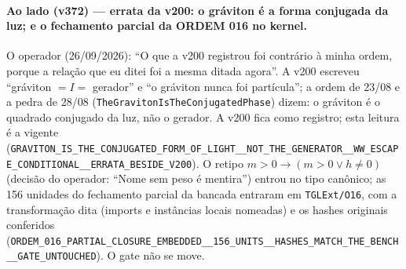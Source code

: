 \documentclass[11pt]{article}
\theoremstyle{definition}\newtheorem{deriv}{Derivação}
\begin{document}
\paragraph*{Ao lado (v372) --- errata da v200: o gráviton é a forma conjugada da luz; e o fechamento parcial da ORDEM 016 no kernel.} O operador (26/09/2026): ``O que a v200 registrou foi contrário à minha ordem, porque a relação que eu ditei foi a mesma ditada agora''. A v200 escreveu ``gráviton $=I=$ gerador'' e ``o gráviton nunca foi partícula''; a ordem de 23/08 e a pedra de 28/08 (\texttt{TheGravitonIsTheConjugatedPhase}) dizem: o gráviton é o quadrado conjugado da luz, não o gerador. A v200 fica como registro; esta leitura é a vigente (\texttt{GRAVITON\_IS\_THE\_CONJUGATED\_FORM\_OF\_LIGHT\_\_NOT\_THE\_GENERATOR\_\_WW\_ESCAPE\_CONDITIONAL\_\_ERRATA\_BESIDE\_V200}). O retipo $m>0\to(m>0\vee h\neq0)$ (decisão do operador: ``Nome sem peso é mentira'') entrou no tipo canônico; as 156 unidades do fechamento parcial da bancada entraram em \texttt{TGLExt/O16}, com a transformação dita (imports e instâncias locais nomeadas) e os hashes originais conferidos (\texttt{ORDEM\_016\_PARTIAL\_CLOSURE\_EMBEDDED\_\_156\_UNITS\_\_HASHES\_MATCH\_THE\_BENCH\_\_GATE\_UNTOUCHED}). O gate não se move.
\end{document}
